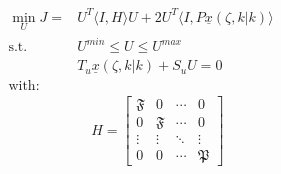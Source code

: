 \begin{equation} \label{eq:MPC_QP}
    \begin{aligned}
        \min_{U} J = &U^T \langle I,H \rangle U + 2U^T \langle I, P \underline{x}(\zeta, k|k) \rangle \\
        \text{s.t.} \quad &U^{min} \leq U \leq U^{max} \\
        &T_u \underline{x}(\zeta, k|k) + S_u U = 0
        \, \\
        \text{with:} &\\
        &\quad H = \begin{bmatrix}
            \mathfrak{F} & 0 & \cdots & 0 \\
            0 & \mathfrak{F} & \cdots & 0 \\
            \vdots & \vdots & \ddots & \vdots \\
            0 & 0 & \cdots & \mathfrak{P}
        \end{bmatrix} \\
    \end{aligned}
\end{equation}
